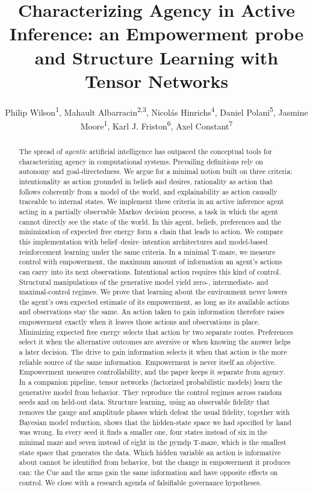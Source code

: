 \documentclass[letterpaper]{article} %
\title{Characterizing Agency in Active Inference: an Empowerment probe and Structure Learning with Tensor Networks}
\author{
    Philip Wilson\textsuperscript{\rm 1},
    Mahault Albarracin\textsuperscript{\rm 2,\rm 3},
    Nicol\'{a}s Hinrichs\textsuperscript{\rm 4},
    Daniel Polani\textsuperscript{\rm 5},
    Jasmine Moore\textsuperscript{\rm 1},
    Karl J. Friston\textsuperscript{\rm 6},
    Axel Constant\textsuperscript{\rm 7}\corresponding
}
\theoremstyle{definition}
\begin{document}
\maketitle

\begin{abstract}
The spread of \emph{agentic} artificial intelligence has outpaced the conceptual tools for characterizing agency in computational systems. Prevailing definitions rely on autonomy and goal-directedness. We argue for a minimal notion built on three criteria: intentionality as action grounded in beliefs and desires, rationality as action that follows coherently from a model of the world, and explainability as action causally traceable to internal states. We implement these criteria in an active inference agent acting in a partially observable Markov decision process, a task in which the agent cannot directly see the state of the world. In this agent, beliefs, preferences and the minimization of expected free energy form a chain that leads to action. We compare this implementation with belief--desire--intention architectures and model-based reinforcement learning under the same criteria. In a minimal T-maze, we measure control with empowerment, the maximum amount of information an agent's actions can carry into its next observations. Intentional action requires this kind of control. Structural manipulations of the generative model yield zero-, intermediate- and maximal-control regimes. We prove that learning about the environment never lowers the agent's own expected estimate of its empowerment, as long as its available actions and observations stay the same. An action taken to gain information therefore raises empowerment exactly when it leaves those actions and observations in place. Minimizing expected free energy selects that action by two separate routes. Preferences select it when the alternative outcomes are aversive or when knowing the answer helps a later decision. The drive to gain information selects it when that action is the more reliable source of the same information. Empowerment is never itself an objective. Empowerment measures controllability, and the paper keeps it separate from agency. In a companion pipeline, tensor networks (factorized probabilistic models) learn the generative model from behavior. They reproduce the control regimes across random seeds and on held-out data. Structure learning, using an observable fidelity that removes the gauge and amplitude phases which defeat the usual fidelity, together with Bayesian model reduction, shows that the hidden-state space we had specified by hand was wrong. In every seed it finds a smaller one, four states instead of six in the minimal maze and seven instead of eight in the pymdp T-maze, which is the smallest state space that generates the data. Which hidden variable an action is informative about cannot be identified from behavior, but the change in empowerment it produces can: the Cue and the arms gain the same information and have opposite effects on control. We close with a research agenda of falsifiable governance hypotheses.
\end{abstract}
\end{document}
